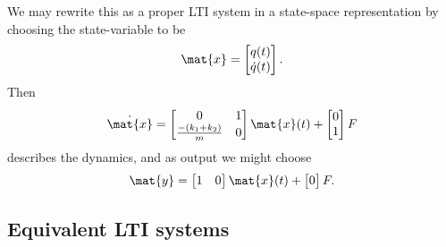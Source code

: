 \begin{example}
    We may rewrite this as a proper LTI system in a state-space representation by choosing the state-variable to be
    \begin{equation}\label{eq:LTI-exa-double-spring-state}
        \mat{x} =
        \begin{bmatrix}
            q(t) \\
            \dot{q}(t)
        \end{bmatrix}.
    \end{equation}
    Then
    \begin{equation}\label{eq:LTI-exa-double-spring-dynamics}
        \dot{\mat{x}} =
        \begin{bmatrix}
            0                       & 1 \\
            \tfrac{-(k_1 + k_2)}{m} & 0
        \end{bmatrix}
        \mat{x}(t) +
        \begin{bmatrix}
            0 \\
            1
        \end{bmatrix}
        F
    \end{equation}
    describes the dynamics, and as output we might choose
    \begin{equation}\label{eq:LTI-exa-double-spring-readout}
        \mat{y} =
        \begin{bmatrix}
            1 & 0
        \end{bmatrix}
        \mat{x}(t) +
        \begin{bmatrix}
            0
        \end{bmatrix}
        F.
    \end{equation}
\end{example}



\subsection{Equivalent LTI systems}

